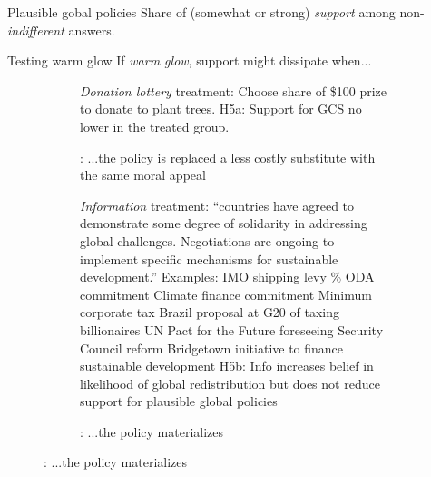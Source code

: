 \documentclass[aspectratio=169,xcolor=dvipsnames, 11pt,mathserif]{beamer}
\begin{document}
\begin{frame}{Plausible gobal policies\label{solidarity_support_relative}}
\centering Share of (somewhat or strong) \textit{support} among non-\textit{indifferent} answers. \quad {} \hyperlink{solidarity_support_absolute}{} \\
\end{frame}

\begin{frame}{Testing warm glow} 
  \centering If \textit{warm glow}, support might dissipate when...
    \begin{figure}
\begin{subfigure}{.38\textwidth}
  \caption[]{\normalsize {}: ...the policy is replaced a less costly substitute with the same moral appeal}
  \bbvs \ip \textit{Donation lottery} treatment: Choose share of \$100 prize to donate to plant trees.
  \ip H5a: Support for GCS no lower in the treated group.
  \ee
  \vspace{3.8cm}
\end{subfigure} \quad \pause
\begin{subfigure}{.59\textwidth}
  \caption[]{\normalsize {}: ...the policy materializes}
  \bbvs \ip \textit{Information} treatment: ``countries have agreed to demonstrate some degree of solidarity in addressing global challenges.  Negotiations are ongoing to implement specific mechanisms for sustainable development.'' Examples:
  \bbvs \ip IMO shipping levy
  \% ODA commitment
  \ip Climate finance commitment
  \ip Minimum corporate tax
  \ip Brazil proposal at G20 of taxing billionaires
  \ip UN Pact for the Future foreseeing Security Council reform
  \ip Bridgetown initiative to finance sustainable development
  \ee
  \ip H5b: Info increases belief in likelihood of global redistribution but does not reduce support for plausible global policies
  \ee
\end{subfigure}
\end{figure}
\end{frame}
\end{document}
